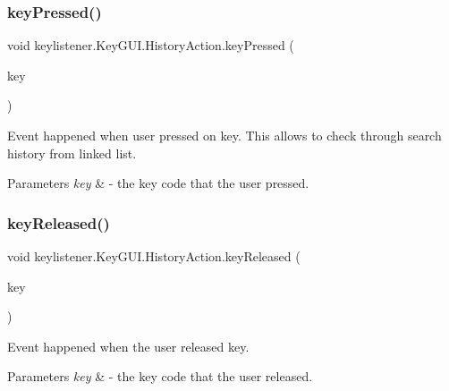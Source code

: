 \subsubsection{\texorpdfstring{key\+Pressed()}{keyPressed()}}
{\footnotesize\ttfamily void keylistener.\+Key\+G\+U\+I.\+History\+Action.\+key\+Pressed (\begin{DoxyParamCaption}\item[{Key\+Event}]{key }\end{DoxyParamCaption})\hspace{0.3cm}{\ttfamily [inline]}}

Event happened when user pressed on key. This allows to check through search history from linked list. 
\begin{DoxyParams}{Parameters}
{\em key} & -\/ the key code that the user pressed. \\
\hline
\end{DoxyParams}
\mbox{\label{classkeylistener_1_1_key_g_u_i_1_1_history_action_a1cf2781870484e23d67b4e429c1c2209}} 
\subsubsection{\texorpdfstring{key\+Released()}{keyReleased()}}
{\footnotesize\ttfamily void keylistener.\+Key\+G\+U\+I.\+History\+Action.\+key\+Released (\begin{DoxyParamCaption}\item[{Key\+Event}]{key }\end{DoxyParamCaption})\hspace{0.3cm}{\ttfamily [inline]}}

Event happened when the user released key. 
\begin{DoxyParams}{Parameters}
{\em key} & -\/ the key code that the user released. \\
\hline
\end{DoxyParams}
\mbox{\label{classkeylistener_1_1_key_g_u_i_1_1_history_action_aff4b5c1bcb45a0c6a30fdd9497528f86}} 
